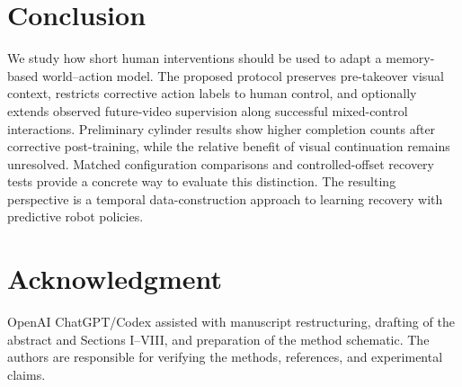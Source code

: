\documentclass[letterpaper,10pt,conference]{ieeeconf}
\begin{document}
\section{Conclusion}
We study how short human interventions should be used to adapt a memory-based world--action model. The proposed protocol preserves pre-takeover visual context, restricts corrective action labels to human control, and optionally extends observed future-video supervision along successful mixed-control interactions. Preliminary cylinder results show higher completion counts after corrective post-training, while the relative benefit of visual continuation remains unresolved. Matched configuration comparisons and controlled-offset recovery tests provide a concrete way to evaluate this distinction. The resulting perspective is a temporal data-construction approach to learning recovery with predictive robot policies.

\section*{Acknowledgment}
OpenAI ChatGPT/Codex assisted with manuscript restructuring, drafting of the abstract and Sections I--VIII, and preparation of the method schematic. The authors are responsible for verifying the methods, references, and experimental claims.


\end{document}
